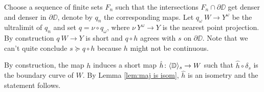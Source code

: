 Choose a sequence of finite sets $F_n$ such that the intersections $F_n\cap\partial \DD$ get denser and denser in $\partial \DD$, 
denote by $q_n$ the corresponding maps.
Let $q_\omega\:W\to Y^\omega$ be the ultralimit of $q_n$ and set $q=\nu\circ q_\omega$,
where $\nu\:Y^\omega\to Y$ is the nearest point projection.
By construction $q\:W\to Y$ is short and $q\circ h$ agrees with $s$ on $\partial \DD$.
Note that we can't quite conclude $s\succcurlyeq q\circ h$ because $h$ might not be continuous.

By construction, the map $h$ induces a short map $\hat h\colon\langle\mathbb{D}\rangle_s\to W$ 
such that $\hat h\circ\delta_s$ is the boundary curve of $W$.
By Lemma \ref{lem:maj is isom}, $\hat h$ is an isometry and the statement follows.
\qeds